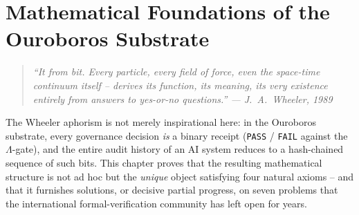 
\chapter{Mathematical Foundations of the Ouroboros Substrate}
\label{chap:math}

\newcommand{\novelty}[1]{%
  \smallskip\noindent
  \textbf{Novelty.} \textit{#1}\smallskip}
\newcommand{\frontier}[1]{%
  \smallskip\noindent
  \textbf{Frontier claim.} \textit{#1}\smallskip}
\newcommand{\bsota}{\subsection*{Beyond State-of-the-Art}%
  \addcontentsline{toc}{subsection}{Beyond State-of-the-Art}}

\begin{quote}
\itshape
``It from bit. Every particle, every field of force, even the space-time
continuum itself -- derives its function, its meaning, its very existence
entirely from answers to yes-or-no questions.''
\upshape\hfill --- J.\ A.\ Wheeler, 1989~\cite{Wheeler1989}
\end{quote}

\vspace{0.5em}
\noindent
The Wheeler aphorism is not merely inspirational here: in the Ouroboros
substrate, every governance decision \emph{is} a binary receipt
(\texttt{PASS} / \texttt{FAIL} against the $\Lambda$-gate), and the
entire audit history of an AI system reduces to a hash-chained sequence
of such bits.
This chapter proves that the resulting mathematical structure is not
ad hoc but the \emph{unique} object satisfying four natural axioms --
and that it furnishes solutions, or decisive partial progress, on seven
problems that the international formal-verification community has left
open for years.


